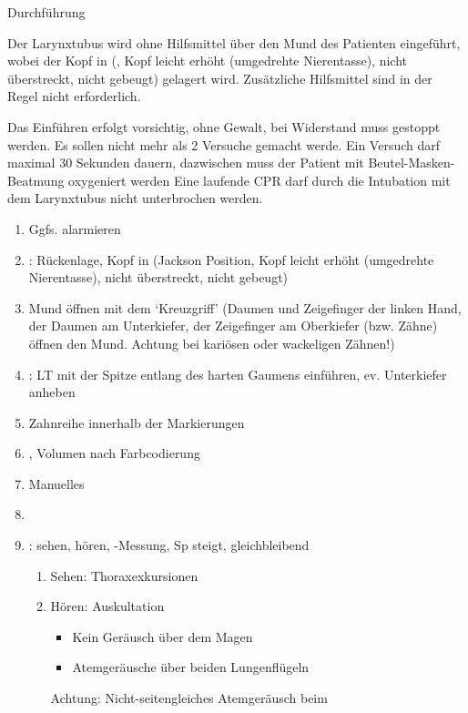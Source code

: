 \documentclass[
ngerman,
paper=a4,
asymmetric,
fontsize=8pt,
draft=false,
numbers=noenddot,
bibtotocnumbered,
footnotes=multiple,
toc=flat,
]{scrbook}
\begin{document}
\Text
{Durchführung}
{Der
Larynxtubus wird ohne Hilfsmittel
über den Mund des Patienten eingeführt, wobei der Kopf
in  (, Kopf
  leicht erhöht (umgedrehte Nierentasse), nicht überstreckt,
  nicht gebeugt) gelagert wird. Zusätzliche Hilfsmittel
 sind in der Regel nicht erforderlich.

Das Einführen erfolgt vorsichtig, ohne Gewalt, bei
Widerstand muss gestoppt werden. Es sollen nicht mehr als 2
Versuche gemacht werde. Ein
Versuch darf maximal 30 Sekunden dauern, dazwischen muss der
Patient mit Beutel-Masken-Beatmung oxygeniert werden
Eine laufende CPR darf durch die Intubation mit dem
Larynxtubus nicht unterbrochen werden.

\begin{enumerate}\CorrectionListsBox
  \item Ggfs.  alarmieren
  \item {}: Rückenlage, Kopf in
   (Jackson Position, Kopf
  leicht erhöht (umgedrehte Nierentasse), nicht überstreckt,
  nicht gebeugt)
  \item Mund öffnen mit dem
  \enquote*{Kreuzgriff} (Daumen und Zeigefinger der linken
  Hand, der Daumen am Unterkiefer, der Zeigefinger am
  Oberkiefer (bzw. Zähne) öffnen den Mund. Achtung bei
  kariösen oder wackeligen Zähnen!)
  \item {}: LT mit der Spitze
  entlang des harten Gaumens einführen, ev. Unterkiefer
  anheben
  \item Zahnreihe innerhalb der Markierungen
  \item
  , Volumen nach Farbcodierung
  \item Manuelles
  \item {}
  \item {}: sehen,
  hören, -Messung, Sp steigt, gleichbleibend
  \begin{enumerate}
    \item Sehen: Thoraxexkursionen
    \item Hören: Auskultation\begin{itemize}
      \item Kein Geräusch über dem
    Magen
    \item Atemgeräusche über beiden Lungenflügeln
    \end{itemize}
    Achtung: Nicht-seitengleiches Atemgeräusch beim

\end{enumerate}
\end{enumerate}}
\end{document}
